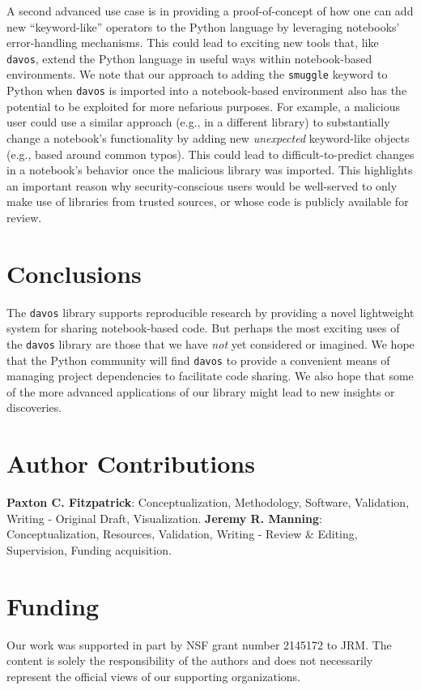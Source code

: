 \documentclass[preprint,12pt,a4paper]{elsarticle}
\begin{document}
A second advanced use case is in providing a proof-of-concept of how
one can add new ``keyword-like'' operators to the Python language by
leveraging notebooks' error-handling mechanisms. This could lead to
exciting new tools that, like \texttt{davos}, extend the Python
language in useful ways within notebook-based environments. We note that
our approach to adding the \texttt{smuggle} keyword to Python when
\texttt{davos} is imported into a notebook-based environment also has
the potential to be exploited for more nefarious purposes. For
example, a malicious user could use a similar approach (e.g., in a
different library) to substantially change a notebook's functionality
by adding new \textit{unexpected} keyword-like objects (e.g., based
around common typos). This could lead to difficult-to-predict changes
in a notebook's behavior once the malicious library was imported.
This highlights an important reason why security-conscious users would
be well-served to only make use of libraries from trusted sources, or
whose code is publicly available for review.

\section{Conclusions}

The \texttt{davos} library supports reproducible research by providing
a novel lightweight system for sharing notebook-based code. But
perhaps the most exciting uses of the \texttt{davos} library are those
that we have \textit{not} yet considered or imagined. We hope that
the Python community will find \texttt{davos} to provide a convenient
means of managing project dependencies to facilitate code sharing. We
also hope that some of the more advanced applications of our library
might lead to new insights or discoveries.


\section*{Author Contributions}
\textbf{Paxton C. Fitzpatrick}: Conceptualization, Methodology,
Software, Validation, Writing - Original Draft,
Visualization. \textbf{Jeremy R. Manning}: Conceptualization,
Resources, Validation, Writing - Review \& Editing, Supervision, Funding
acquisition.

\section*{Funding}
Our work was supported in part by NSF grant number 2145172 to JRM.
The content is solely the responsibility of the authors and does not necessarily represent the official views of our supporting organizations.
\end{document}
